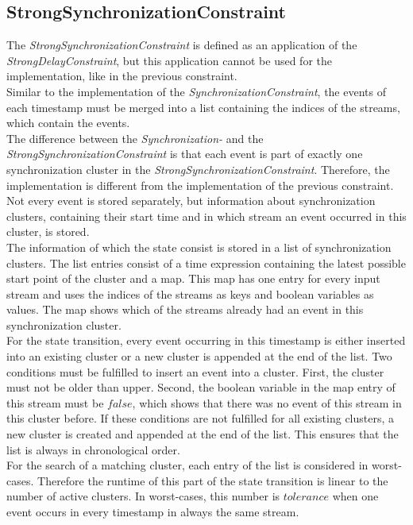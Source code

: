 \subsection{StrongSynchronizationConstraint}
	The \emph{StrongSynchronizationConstraint} is defined as an application of the \emph{StrongDelayConstraint}, but this application cannot be used for the implementation, like in the previous constraint.\\
	Similar to the implementation of the \emph{SynchronizationConstraint}, the events of each timestamp must be merged into a list containing the indices of the streams, which contain the events.\\
	The difference between the \emph{Synchronization-} and the \emph{StrongSynchronizationConstraint} is that each event is part of exactly one synchronization cluster in the \emph{StrongSynchronizationConstraint}. Therefore, the implementation is different from the implementation of the previous constraint. Not every event is stored separately, but information about synchronization clusters, containing their start time and in which stream an event occurred in this cluster, is stored.\\
	The information of which the state consist is stored in a list of synchronization clusters. The list entries consist of a time expression containing the latest possible start point of the cluster and a map. This map has one entry for every input stream and uses the indices of the streams as keys and boolean variables as values. The map shows which of the streams already had an event in this synchronization cluster.\\
	For the state transition, every event occurring in this timestamp is either inserted into an existing cluster or a new cluster is appended at the end of the list. Two conditions must be fulfilled to insert an event into a cluster. First, the cluster must not be older than upper. Second, the boolean variable in the map entry of this stream must be $false$, which shows that there was no event of this stream in this cluster before. If these conditions are not fulfilled for all existing clusters, a new cluster is created and appended at the end of the list. This ensures that the list is always in chronological order.\\
	For the search of a matching cluster, each entry of the list is considered in worst-cases. Therefore the runtime of this part of the state transition is linear to the number of active clusters. In worst-cases, this number is $tolerance$ when one event occurs in every timestamp in always the same stream.\\

